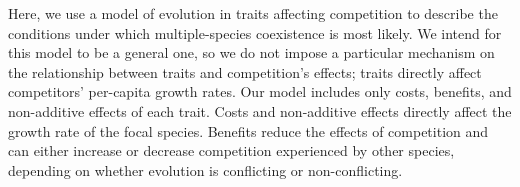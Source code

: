 Here, we use a model of evolution in traits affecting competition to describe
the conditions under which multiple-species coexistence is most likely.
We intend for this model to be a general one, so we do not impose a particular 
mechanism on the relationship between traits and competition’s effects;
traits directly affect competitors' per-capita growth rates.
Our model includes only costs, benefits, and non-additive effects of each trait. 
Costs and non-additive effects directly affect the growth rate of the focal species.
Benefits reduce the effects of competition and can either increase or decrease 
competition experienced by other species, depending
on whether evolution is conflicting or non-conflicting.


